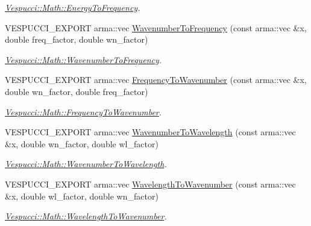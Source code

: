 \begin{DoxyCompactItemize}
\begin{DoxyCompactList}\small\item\em \hyperlink{namespace_vespucci_1_1_math_a0edab1a9ba195597f85b664d6b405132}{Vespucci\+::\+Math\+::\+Energy\+To\+Frequency}. \end{DoxyCompactList}\item 
V\+E\+S\+P\+U\+C\+C\+I\+\_\+\+E\+X\+P\+O\+RT arma\+::vec \hyperlink{namespace_vespucci_1_1_math_a0c45b8475991e31f16ddba031812ad1f}{Wavenumber\+To\+Frequency} (const arma\+::vec \&x, double freq\+\_\+factor, double wn\+\_\+factor)
\begin{DoxyCompactList}\small\item\em \hyperlink{namespace_vespucci_1_1_math_a0c45b8475991e31f16ddba031812ad1f}{Vespucci\+::\+Math\+::\+Wavenumber\+To\+Frequency}. \end{DoxyCompactList}\item 
V\+E\+S\+P\+U\+C\+C\+I\+\_\+\+E\+X\+P\+O\+RT arma\+::vec \hyperlink{namespace_vespucci_1_1_math_aee17fb374bd6f0b6745b84148776f881}{Frequency\+To\+Wavenumber} (const arma\+::vec \&x, double wn\+\_\+factor, double freq\+\_\+factor)
\begin{DoxyCompactList}\small\item\em \hyperlink{namespace_vespucci_1_1_math_aee17fb374bd6f0b6745b84148776f881}{Vespucci\+::\+Math\+::\+Frequency\+To\+Wavenumber}. \end{DoxyCompactList}\item 
V\+E\+S\+P\+U\+C\+C\+I\+\_\+\+E\+X\+P\+O\+RT arma\+::vec \hyperlink{namespace_vespucci_1_1_math_a9e08ae990ca7b386e10db26a6f83560b}{Wavenumber\+To\+Wavelength} (const arma\+::vec \&x, double wn\+\_\+factor, double wl\+\_\+factor)
\begin{DoxyCompactList}\small\item\em \hyperlink{namespace_vespucci_1_1_math_a9e08ae990ca7b386e10db26a6f83560b}{Vespucci\+::\+Math\+::\+Wavenumber\+To\+Wavelength}. \end{DoxyCompactList}\item 
V\+E\+S\+P\+U\+C\+C\+I\+\_\+\+E\+X\+P\+O\+RT arma\+::vec \hyperlink{namespace_vespucci_1_1_math_a55b8f11bb43e937c779db4cb74fc9d6e}{Wavelength\+To\+Wavenumber} (const arma\+::vec \&x, double wl\+\_\+factor, double wn\+\_\+factor)
\begin{DoxyCompactList}\small\item\em \hyperlink{namespace_vespucci_1_1_math_a55b8f11bb43e937c779db4cb74fc9d6e}{Vespucci\+::\+Math\+::\+Wavelength\+To\+Wavenumber}. \end{DoxyCompactList}\item 

\end{DoxyCompactItemize}
